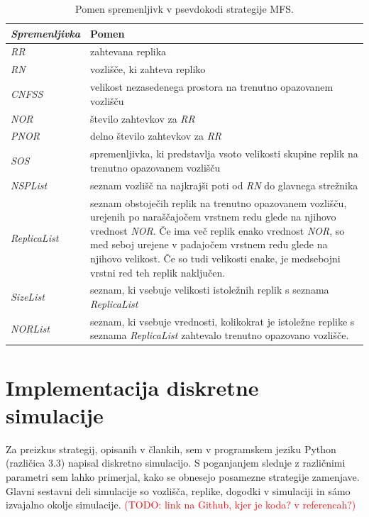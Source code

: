 \documentclass[a4paper, 12pt]{book}
\newcommand{\TODO}[1]{\textcolor{red}{(TODO: #1)}}
\begin{document}
\begin{table}
\small
  \begin{center}
    \begin{tabulary}{1.0\textwidth}{ >{\itshape}p{6.8em} p{26em}}
      \textnormal{Spremenljivka} & Pomen \\
      \hline
      RR & zahtevana replika \\
      RN &  vozlišče, ki zahteva repliko \\
      CNFSS & velikost nezasedenega prostora na trenutno opazovanem
          \mbox{vozlišču} \\
      NOR & število zahtevkov za \textit{RR} \\
      PNOR & delno število zahtevkov za \textit{RR} \\
      SOS & spremenljivka, ki predstavlja vsoto velikosti skupine replik na
          trenutno opazovanem vozlišču \\
      NSPList & seznam vozlišč na najkrajši poti od \textit{RN} do
          glavnega strežnika \\
      ReplicaList & seznam obstoječih replik na trenutno opazovanem vozlišču,
          urejenih po naraščajočem vrstnem redu glede na njihovo vrednost
          \textit{NOR}.
          Če ima več replik enako vrednost \textit{NOR}, so med seboj
          urejene v padajočem vrstnem redu glede na njihovo velikost. Če so
          tudi velikosti enake, je medsebojni vrstni red teh replik
          naključen. \\
      SizeList & seznam, ki vsebuje velikosti istoležnih replik s seznama
          \textit{ReplicaList} \\
      NORList & seznam, ki vsebuje vrednosti, kolikokrat je istoležne
          replike s seznama \textit{ReplicaList} zahtevalo trenutno opazovano
          vozlišče. \\
    \end{tabulary}
  \end{center}

  \caption{Pomen spremenljivk v psevdokodi strategije MFS.}
  \label{tbl:MFS_vars}
\end{table}


\section{Implementacija diskretne simulacije}

Za preizkus strategij, opisanih v člankih, sem v programskem jeziku Python
(različica 3.3) napisal diskretno simulacijo. S poganjanjem slednje z
raz\-ličnimi parametri sem lahko primerjal, kako se obnesejo posamezne
strategije zamenjave. Glavni sestavni deli simulacije so vozlišča, replike,
dogodki v simulaciji in sámo izvajalno okolje simulacije. \TODO{link na Github,
kjer je koda? v referencah?}
\end{document}
